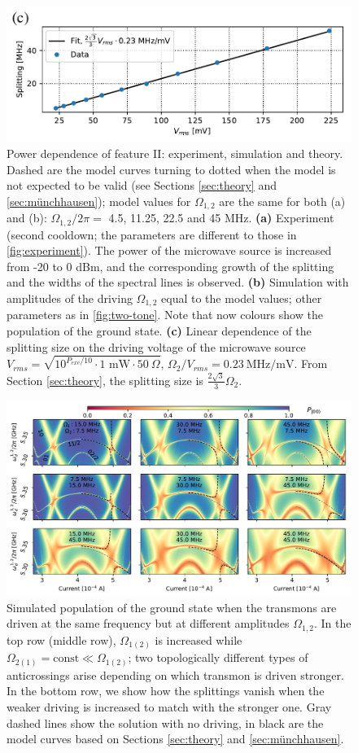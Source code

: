 \documentclass[%
 pra,
 amsmath,amssymb,
 reprint,%
]{revtex4-1}
\begin{document}
\begin{figure}
	\includegraphics[width=.7\linewidth]{powerscan_1d}
	\caption{Power dependence of feature II: 
	experiment, simulation and theory. Dashed are 
	the model curves turning to dotted when the 
	model is not expected to be valid (see 
	Sections \ref{sec:theory} and 
	\ref{sec:münchhausen}); model values for 
	$\Omega_{1,2}$ are the same for both (a) and 
	(b): $\Omega_{1,2}/2\pi=$ 4.5, 11.25, 22.5 
	and 45 MHz. \textbf{(a)} Experiment (second 
	cooldown; the parameters are different to 
	those in \autoref{fig:experiment}). The power 
	of the microwave source is increased from -20 
	to 0 dBm, and the corresponding growth of the 
	splitting and the widths of the spectral 
	lines is observed. \textbf{(b)} Simulation 
	with amplitudes of the driving $\Omega_{1,2}$ 
	equal to the model values; other parameters 
	as in \autoref{fig:two-tone}. Note that now 
	colours show the population of the ground 
	state. \textbf{(c)} Linear dependence of the 
	splitting size on the driving voltage of the 
	microwave source $V_{rms} = 
	\sqrt{10^{P_{exc}/10}\cdot 1 \text{ mW} \cdot 
	50\ \Omega}$, ${\Omega_2}/{V_{rms}} = 0.23\ 
	{\text{MHz}}/{\text{mV}}$. From Section 
	\ref{sec:theory}, the splitting size is 
	$\frac{2\sqrt{3}}{3} \Omega_2$.}
	\label{fig:zoom}
\end{figure}


\begin{figure}
	\centering
	\includegraphics[width=\linewidth]{topological_splittings}
	\caption{Simulated population of the ground 
	state when the transmons are driven at the 
	same frequency but at different amplitudes 
	$\Omega_{1,2}$. In the top row (middle row), 
	$\Omega_{1(2)}$ is increased while 
	$\Omega_{2(1)} = \text{const} \ll 
	\Omega_{1(2)}$; two topologically different 
	types of anticrossings arise depending on 
	which transmon is driven stronger. In the 
	bottom row, we show how the splittings vanish 
	when the weaker driving is increased to match 
	with the stronger one. Gray dashed lines show 
	the solution with no driving, in black are 
	the model curves based on Sections 
	\ref{sec:theory} and \ref{sec:münchhausen}.}
	\label{fig:difdrive}
\end{figure}
\end{document}

